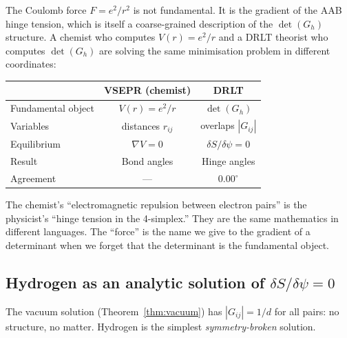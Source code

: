 \begin{remark}
The Coulomb force $F = e^2/r^2$ is not fundamental.  It is the gradient of the AAB hinge tension, which is itself a coarse-grained description of the $\det(G_h)$ structure.  A chemist who computes $V(r) = e^2/r$ and a DRLT theorist who computes $\det(G_h)$ are solving the same minimisation problem in different coordinates:
\begin{center}
\begin{tabular}{lcc}
\hline
& VSEPR (chemist) & DRLT \\
\hline
Fundamental object & $V(r) = e^2/r$ & $\det(G_h)$ \\
Variables & distances $r_{ij}$ & overlaps $|G_{ij}|$ \\
Equilibrium & $\nabla V = 0$ & $\delta S / \delta\psi = 0$ \\
Result & Bond angles & Hinge angles \\
Agreement & --- & $0.00^\circ$ \\
\hline
\end{tabular}
\end{center}
The chemist's ``electromagnetic repulsion between electron pairs'' is the physicist's ``hinge tension in the 4-simplex.''  They are the same mathematics in different languages.  The ``force'' is the name we give to the gradient of a determinant when we forget that the determinant is the fundamental object.

\subsection{Hydrogen as an analytic solution of $\delta S/\delta\psi = 0$}
\label{sec:hydrogen_analytic}

The vacuum solution (Theorem~\ref{thm:vacuum}) has $|G_{ij}| = 1/d$ for all pairs: no structure, no matter.  Hydrogen is the simplest \emph{symmetry-broken} solution.


\end{remark}
